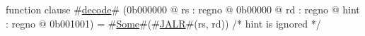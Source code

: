 function clause #\hyperref[zdecode]{decode}# (0b000000 @ rs : regno @ 0b00000 @ rd : regno @ hint : regno @ 0b001001) =
  #\hyperref[zSome]{Some}#(#\hyperref[zJALR]{JALR}#(rs, rd)) /* hint is ignored */
